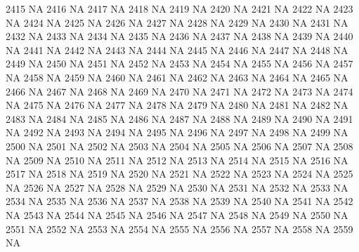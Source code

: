 \documentclass{article}
\begin{document}
\begin{Schunk}
\begin{Soutput}
2415           NA
2416           NA
2417           NA
2418           NA
2419           NA
2420           NA
2421           NA
2422           NA
2423           NA
2424           NA
2425           NA
2426           NA
2427           NA
2428           NA
2429           NA
2430           NA
2431           NA
2432           NA
2433           NA
2434           NA
2435           NA
2436           NA
2437           NA
2438           NA
2439           NA
2440           NA
2441           NA
2442           NA
2443           NA
2444           NA
2445           NA
2446           NA
2447           NA
2448           NA
2449           NA
2450           NA
2451           NA
2452           NA
2453           NA
2454           NA
2455           NA
2456           NA
2457           NA
2458           NA
2459           NA
2460           NA
2461           NA
2462           NA
2463           NA
2464           NA
2465           NA
2466           NA
2467           NA
2468           NA
2469           NA
2470           NA
2471           NA
2472           NA
2473           NA
2474           NA
2475           NA
2476           NA
2477           NA
2478           NA
2479           NA
2480           NA
2481           NA
2482           NA
2483           NA
2484           NA
2485           NA
2486           NA
2487           NA
2488           NA
2489           NA
2490           NA
2491           NA
2492           NA
2493           NA
2494           NA
2495           NA
2496           NA
2497           NA
2498           NA
2499           NA
2500           NA
2501           NA
2502           NA
2503           NA
2504           NA
2505           NA
2506           NA
2507           NA
2508           NA
2509           NA
2510           NA
2511           NA
2512           NA
2513           NA
2514           NA
2515           NA
2516           NA
2517           NA
2518           NA
2519           NA
2520           NA
2521           NA
2522           NA
2523           NA
2524           NA
2525           NA
2526           NA
2527           NA
2528           NA
2529           NA
2530           NA
2531           NA
2532           NA
2533           NA
2534           NA
2535           NA
2536           NA
2537           NA
2538           NA
2539           NA
2540           NA
2541           NA
2542           NA
2543           NA
2544           NA
2545           NA
2546           NA
2547           NA
2548           NA
2549           NA
2550           NA
2551           NA
2552           NA
2553           NA
2554           NA
2555           NA
2556           NA
2557           NA
2558           NA
2559           NA

\end{Soutput}
\end{Schunk}
\end{document}
